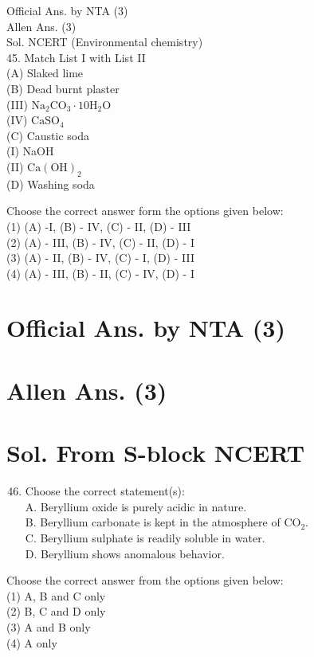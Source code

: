 \documentclass[10pt]{article}
\begin{document}
Official Ans. by NTA (3)\\
Allen Ans. (3)\\
Sol. NCERT (Environmental chemistry)\\
45. Match List I with List II\\
(A) Slaked lime\\
(B) Dead burnt plaster\\
(III) \(\mathrm{Na}_{2} \mathrm{CO}_{3} \cdot 10 \mathrm{H}_{2} \mathrm{O}\)\\
(IV) \(\mathrm{CaSO}_{4}\)\\
(C) Caustic soda\\
(I) NaOH\\
(II) \(\mathrm{Ca}(\mathrm{OH})_{2}\)\\
(D) Washing soda

Choose the correct answer form the options given below:\\
(1) (A) -I, (B) - IV, (C) - II, (D) - III\\
(2) (A) - III, (B) - IV, (C) - II, (D) - I\\
(3) (A) - II, (B) - IV, (C) - I, (D) - III\\
(4) (A) - III, (B) - II, (C) - IV, (D) - I

\section*{Official Ans. by NTA (3)}
\section*{Allen Ans. (3)}
\section*{Sol. From S-block NCERT}
\begin{enumerate}
  \setcounter{enumi}{45}
  \item Choose the correct statement(s):\\
A. Beryllium oxide is purely acidic in nature.\\
B. Beryllium carbonate is kept in the atmosphere of \(\mathrm{CO}_{2}\).\\
C. Beryllium sulphate is readily soluble in water.\\
D. Beryllium shows anomalous behavior.
\end{enumerate}

Choose the correct answer from the options given below:\\
(1) A, B and C only\\
(2) B, C and D only\\
(3) A and B only\\
(4) A only
\end{document}
